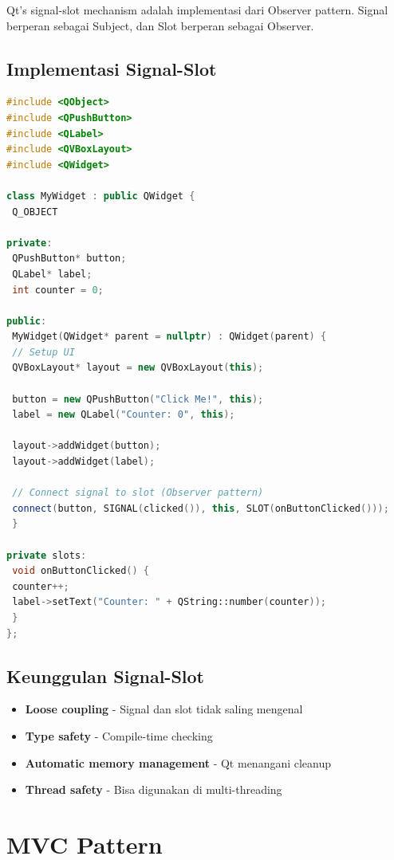 Qt's signal-slot mechanism adalah implementasi dari Observer pattern. Signal berperan sebagai Subject, dan Slot berperan sebagai Observer.

\subsection{Implementasi Signal-Slot}

\begin{lstlisting}[language=c++, caption=Signal-Slot Implementation]
#include <QObject>
#include <QPushButton>
#include <QLabel>
#include <QVBoxLayout>
#include <QWidget>

class MyWidget : public QWidget {
 Q_OBJECT

private:
 QPushButton* button;
 QLabel* label;
 int counter = 0;

public:
 MyWidget(QWidget* parent = nullptr) : QWidget(parent) {
 // Setup UI
 QVBoxLayout* layout = new QVBoxLayout(this);

 button = new QPushButton("Click Me!", this);
 label = new QLabel("Counter: 0", this);

 layout->addWidget(button);
 layout->addWidget(label);

 // Connect signal to slot (Observer pattern)
 connect(button, SIGNAL(clicked()), this, SLOT(onButtonClicked()));
 }

private slots:
 void onButtonClicked() {
 counter++;
 label->setText("Counter: " + QString::number(counter));
 }
};
\end{lstlisting}

\subsection{Keunggulan Signal-Slot}

\begin{itemize}
\item \textbf{Loose coupling} - Signal dan slot tidak saling mengenal
\item \textbf{Type safety} - Compile-time checking
\item \textbf{Automatic memory management} - Qt menangani cleanup
\item \textbf{Thread safety} - Bisa digunakan di multi-threading
\end{itemize}

\section{MVC Pattern}

